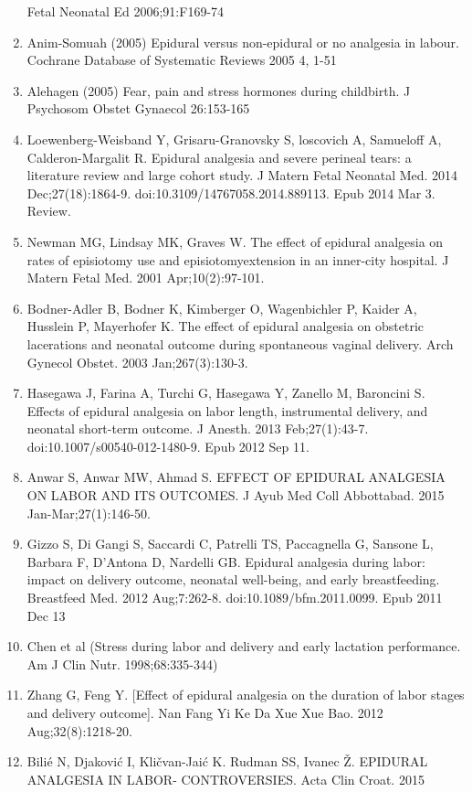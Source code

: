 \documentclass[]{article}
\begin{document}
\begin{enumerate}
  Fetal Neonatal Ed 2006;91:F169-74
\item
  Anim-Somuah (2005) Epidural versus non-epidural or no analgesia in
  labour. Cochrane Database of Systematic Reviews 2005 4, 1-51
\item
  Alehagen (2005) Fear, pain and stress hormones during childbirth. J
  Psychosom Obstet Gynaecol 26:153-165
\item
  Loewenberg-Weisband Y, Grisaru-Granovsky S, loscovich A, Samueloff A,
  Calderon-Margalit R. Epidural analgesia and severe perineal tears: a
  literature review and large cohort study. J Matern Fetal Neonatal Med.
  2014 Dec;27(18):1864-9. doi:10.3109/14767058.2014.889113. Epub 2014
  Mar 3. Review.
\item
  Newman MG, Lindsay MK, Graves W. The effect of epidural analgesia on
  rates of episiotomy use and episiotomyextension in an inner-city
  hospital. J Matern Fetal Med. 2001 Apr;10(2):97-101.
\item
  Bodner-Adler B, Bodner K, Kimberger O, Wagenbichler P, Kaider A,
  Husslein P, Mayerhofer K. The effect of epidural analgesia on
  obstetric lacerations and neonatal outcome during spontaneous vaginal
  delivery. Arch Gynecol Obstet. 2003 Jan;267(3):130-3.
\item
  Hasegawa J, Farina A, Turchi G, Hasegawa Y, Zanello M, Baroncini S.
  Effects of epidural analgesia on labor length, instrumental delivery,
  and neonatal short-term outcome. J Anesth. 2013 Feb;27(1):43-7.
  doi:10.1007/s00540-012-1480-9. Epub 2012 Sep 11.
\item
  Anwar S, Anwar MW, Ahmad S. EFFECT OF EPIDURAL ANALGESIA ON LABOR AND
  ITS OUTCOMES. J Ayub Med Coll Abbottabad. 2015 Jan-Mar;27(1):146-50.
\item
  Gizzo S, Di Gangi S, Saccardi C, Patrelli TS, Paccagnella G, Sansone
  L, Barbara F, D'Antona D, Nardelli GB. Epidural analgesia during
  labor: impact on delivery outcome, neonatal well-being, and early
  breastfeeding. Breastfeed Med. 2012 Aug;7:262-8.
  doi:10.1089/bfm.2011.0099. Epub 2011 Dec 13
\item
  Chen et al (Stress during labor and delivery and early lactation
  performance. Am J Clin Nutr. 1998;68:335-344)
\item
  Zhang G, Feng Y. {[}Effect of epidural analgesia on the duration of
  labor stages and delivery outcome{]}. Nan Fang Yi Ke Da Xue Xue Bao.
  2012 Aug;32(8):1218-20.
\item
  Bilié N, Djaković I, Kličvan-Jaić K. Rudman SS, Ivanec Ž. EPIDURAL
  ANALGESIA IN LABOR- CONTROVERSIES. Acta Clin Croat. 2015

\end{enumerate}
\end{document}
